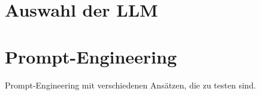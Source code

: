 \section{Auswahl der LLM}

\section{Prompt-Engineering}
Prompt-Engineering mit verschiedenen Ansätzen, die zu testen sind.
